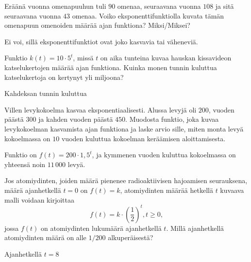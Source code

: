 \begin{tehtavasivu}
\begin{tehtava}
Eräänä vuonna omenapuuhun tuli $90$ omenaa, seuraavana vuonna $108$ ja sitä seuraavana vuonna $43$ omenaa. Voiko eksponenttifunktiolla kuvata tämän omenapuun omenoiden määrää ajan funktiona? Miksi/Miksei?
\begin{vastaus}
Ei voi, sillä eksponenttifunktiot ovat joko kasvavia tai väheneviä.
\end{vastaus}
\end{tehtava}

\begin{tehtava}
Funktio $k(t) = 10 \cdot 5^t$, missä $t$ on aika tunteina kuvaa hauskan kissavideon katselukertojen määrää ajan funktiona. Kuinka monen tunnin kuluttua katselukertoja on kertynyt yli miljoona?
\begin{vastaus}
Kahdeksan tunnin kuluttua
\end{vastaus}
\end{tehtava}

\begin{tehtava}
Villen levykokoelma kasvaa eksponentiaalisesti. Alussa levyjä oli $200$, vuoden päästä $300$ ja kahden vuoden päästä $450$. Muodosta funktio, joka kuvaa levykokoelman kasvamista ajan funktiona ja laske arvio sille, miten monta levyä kokoelmassa on $10$ vuoden kuluttua kokoelman keräämisen aloittamisesta.
\begin{vastaus}
Funktio on $f(t) = 200 \cdot 1,5^t$, ja kymmenen vuoden kuluttua kokoelmassa on yhteensä noin $11\,000$ levyä.
\end{vastaus}
\end{tehtava}

\begin{tehtava} %
Jos atomiydinten, joiden määrä pienenee radioaktiivisen hajoamisen seurauksena, määrä ajanhetkellä $t=0$ on $f(t)=k$, atomiydinten määrää hetkellä $t$ kuvaava malli voidaan kirjoittaa \[f(t) = k \cdot \left( \frac{1}{2} \right)^t, t \ge 0,\] jossa $f(t)$ on atomiydinten lukumäärä ajanhetkellä $t$. Millä ajanhetkellä atomiydinten määrä on alle $1/200$ alkuperäisestä?
\begin{vastaus}
Ajanhetkellä $t = 8$
\end{vastaus}
\end{tehtava}


\end{tehtavasivu}

